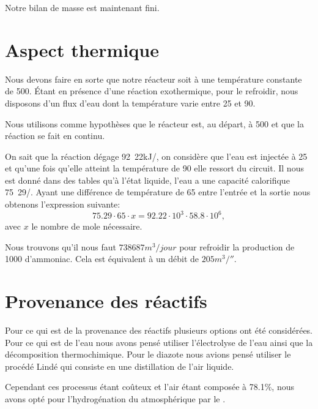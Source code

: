 Notre bilan de masse est maintenant fini.

\section{Aspect thermique}

Nous devons faire en sorte que notre réacteur soit à une température constante de \unit{500}{\celsius}. Étant en présence d'une réaction exothermique, pour le refroidir, nous disposons d'un flux d'eau dont la température varie entre \unit{25}{\celsius} et \unit{90}{\celsius}.


Nous utilisons comme hypothèses que le réacteur est, au départ, à \unit{500}{\celsius} et que la réaction se fait en continu.


On sait que la réaction dégage \unit{92.22}{kJ/\mole}, on considère que l'eau est injectée à \unit{25}{\celsius} et qu'une fois qu'elle atteint la température de \unit{90}{\celsius} elle ressort du circuit. 
Il nous est donné dans des tables qu'à l'état liquide, l'eau a une capacité calorifique \unit{75.29}{\joule/\kelvin \cdot \mole}. Ayant une différence de température de \unit{65}{\celsius} entre l'entrée et la sortie nous obtenons l'expression suivante:
$$ 75.29\cdot 65 \cdot x = 92.22\cdot 10^3 \cdot 58.8 \cdot 10^6,$$
avec $x$ le nombre de mole  nécessaire.

Nous trouvons qu'il nous faut $\unit{738687}{m^3/jour}$ pour refroidir la production de \unit{1000}{\tonne} d'ammoniac. Cela est équivalent à un débit de $\unit{205}{m^3/\second}$.



\section{Provenance des réactifs}
 
Pour ce qui est de la provenance des réactifs plusieurs options ont été considérées. Pour ce qui est de l'eau nous avons pensé utiliser l'électrolyse de l'eau ainsi que la décomposition thermochimique. Pour le diazote nous avions pensé utiliser le procédé Lindé qui consiste en une distillation de l'air liquide.

Cependant ces processus étant coûteux et l'air étant composée à 78.1\%, nous avons opté pour l'hydrogénation du  atmosphérique par le . 

